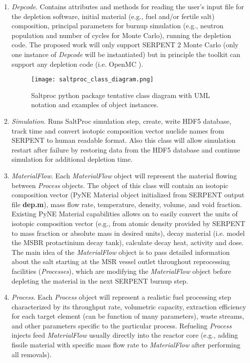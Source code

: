 \begin{enumerate}
	\item \textit{Depcode}. Contains attributes and methods for 
	reading the user's input file for the depletion software, initial 
	material (e.g., fuel and/or fertile salt) composition, principal 
	parameters for 
	burnup simulation (e.g., neutron population and number of cycles for Monte 
	Carlo), running the depletion code. The proposed work will only 
	support SERPENT 2 Monte Carlo (only 
	one instance of \textit{Depcode} will be instantiated) but in principle the 
	toolkit can support any depletion code (i.e. OpenMC 
	\cite{romano_openmc_2015}).
\begin{figure}[ht!] %
  \texttt{[image: saltproc\_class\_diagram.png]}
  \caption{Saltproc python package tentative class diagram with UML notation 
  and examples of object instances.}
  \label{fig:saltproc_class}
\end{figure}
	\item \textit{Simulation}. Runs SaltProc simulation step, 
	create, write HDF5 database, track time and convert 
	isotopic composition vector nuclide names from SERPENT to human 
	readable format. Also this class will allow simulation restart after 
	failure by restoring data from the HDF5 database and continue simulation 
	for additional depletion time.
	
	\item \textit{MaterialFlow}. Each \textit{MaterialFlow} object 
	will represent the material flowing between \textit{Process} objects. 
	The object of this class will contain an isotopic composition vector 
	(PyNE Material object 
	initialized	from SERPENT output file \textbf{dep.m}), mass flow rate, 
	temperature, density, volume, and void fraction. Existing PyNE Material 
	capabilities allows on to easily convert the units of isotopic 
	composition vector (e.g., from atomic density provided by SERPENT to 
	mass fraction or absolute mass in desired units), decay material 
	(i.e. model the \gls{MSBR} protactinium decay tank), calculate 
	decay heat, activity and dose. The main idea of the \textit{MaterialFlow} 
	object is to pass detailed information about the salt starting at the 
	\gls{MSR} vessel outlet throughout reprocessing facilities 
	(\textit{Processes}), which are modifying the \textit{MaterialFlow} 
	object before depleting the material in the next SERPENT burnup step.
		
	\item \textit{Process}. Each \textit{Process} object will represent a 
	realistic fuel processing step characterized by its throughput rate, 
	volumetric capacity, extraction efficiency for each target element (can be 
	function of many parameters), waste streams, and other parameters specific to 		the particular process. Refueling 
	\textit{Process} injects feed \textit{MaterialFlow} usually directly 
	into the reactor core (e.g., adding fissile material with specific mass flow 		rate to \textit{MaterialFlow} after performing all removals).
\end{enumerate}

